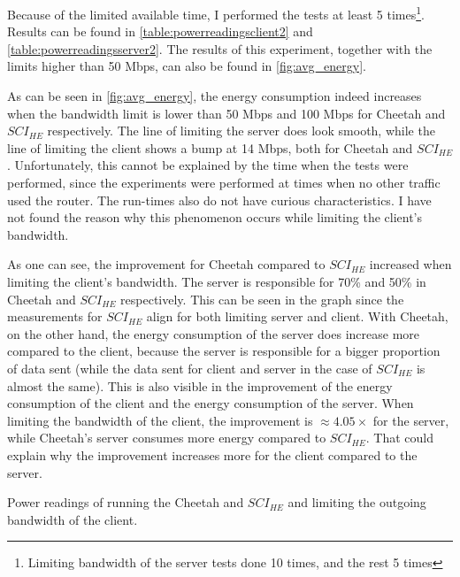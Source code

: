 \documentclass[../thesis.tex]{subfiles}
\begin{document}
Because of the limited available time, I performed the tests at least 5 times\footnote{Limiting bandwidth of the server tests done 10 times, and the rest 5 times}. Results can be found in \autoref{table:powerreadingsclient2} and \autoref{table:powerreadingsserver2}. The results of this experiment, together with the limits higher than 50 Mbps, can also be found in \autoref{fig:avg_energy}.

As can be seen in \autoref{fig:avg_energy}, the energy consumption indeed increases when the bandwidth limit is lower than 50 Mbps and 100 Mbps for Cheetah and $SCI_{HE}$ respectively. The line of limiting the server does look smooth, while the line of limiting the client shows a bump at 14 Mbps, both for Cheetah and $SCI_{HE}$. Unfortunately, this cannot be explained by the time when the tests were performed, since the experiments were performed at times when no other traffic used the router. The run-times also do not have curious characteristics. I have not found the reason why this phenomenon occurs while limiting the client's bandwidth.

As one can see, the improvement for Cheetah compared to $SCI_{HE}$ increased when limiting the client's bandwidth. The server is responsible for 70\% and 50\% in Cheetah and $SCI_{HE}$ respectively. This can be seen in the graph since the measurements for $SCI_{HE}$ align for both limiting server and client. With Cheetah, on the other hand, the energy consumption of the server does increase more compared to the client, because the server is responsible for a bigger proportion of data sent (while the data sent for client and server in the case of $SCI_{HE}$ is almost the same). This is also visible in the improvement of the energy consumption of the client and the energy consumption of the server. When limiting the bandwidth of the client, the improvement is $\approx4.05\times$ for the server, while Cheetah's server consumes more energy compared to $SCI_{HE}$. That could explain why the improvement increases more for the client compared to the server. 
\endgroup
\begingroup
    \setlength{\intextsep}{10pt}
    \setlength{\columnsep}{0pt}
\begin{table}[ht]
        \begin{adjustbox}{width=\columnwidth,center}
                
        \end{adjustbox}
        \caption{Power readings of running the Cheetah and $SCI_{HE}$ and limiting the outgoing bandwidth of the client.}
        \label{table:powerreadingsclient2}
\end{table}
\end{document}
